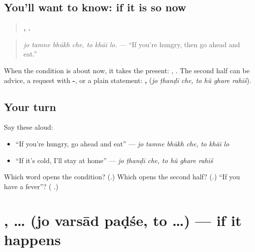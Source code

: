 \subsection*{You'll want to know: if it is so now}
\begin{quote}
\textbf{   ,   .}
\end{quote}

\begin{quote}
\emph{jo tamne bhūkh che, to khāī lo.} — \textquotedblleft{}If you're hungry, then go ahead and eat.\textquotedblright{}
\end{quote}

When the condition is about now, it takes the present: \textbf{   }, \textbf{   }. The second half can be advice, a request with \textbf{-}, or a plain statement: \textbf{  ,    } (\emph{jo ṭhanḍī che, to hũ ghare rahīś}).

\subsection*{Your turn}
Say these aloud:

\begin{itemize}
\raggedright
  \item \textquotedblleft{}If you're hungry, go ahead and eat\textquotedblright{} — \emph{jo tamne bhūkh che, to khāī lo}
  \item \textquotedblleft{}If it's cold, I'll stay at home\textquotedblright{} — \emph{jo ṭhanḍī che, to hũ ghare rahīś}
\end{itemize}

\begin{tcolorbox}[breakable,colback=teal!4,colframe=teal!35!black,title={Before you move on}]
Which word opens the condition? (\textbf{}.) Which opens the second half? (\textbf{}.) \textquotedblleft{}If you have a fever\textquotedblright{}? (\textbf{   }.)
\end{tcolorbox}
\section[\texorpdfstring{\gu{જો} \gu{વરસાદ} \gu{પડશે}, \gu{તો} … (jo varsād paḍśe …)}{જો વરસાદ પડશે, તો … (jo varsād paḍśe …)}]{  ,  … (jo varsād paḍśe, to …) — if it happens}

